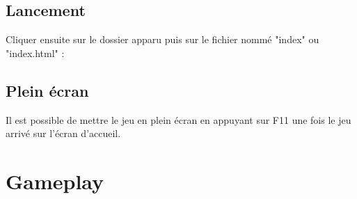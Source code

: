 \documentclass{article}
\begin{document}
\subsection{Lancement}
Cliquer ensuite sur le dossier apparu puis sur le fichier nommé "index" ou "index.html" :
\vspace{0.5cm}\\
\subsection{Plein écran}
Il est possible de mettre le jeu en plein écran en appuyant sur F11 une fois le jeu arrivé sur l'écran d'accueil. 

\newpage
\section{Gameplay}
\end{document}
